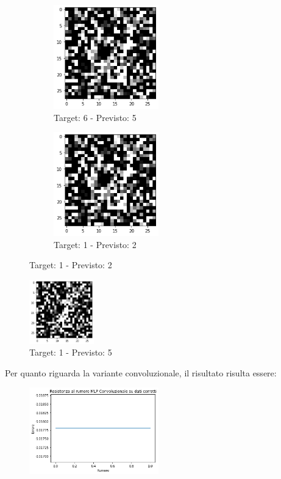 \documentclass[12pt, a4paper]{article}
\begin{document}
\begin{figure}[H]
    \begin{subfigure}{0.5\textwidth}
        \centering
        \caption{Target: 6 - Previsto: 5}
        \includegraphics[width=0.5\textwidth]{ErrClass3.png}
    \end{subfigure}
    \begin{subfigure}{0.5\textwidth}
        \centering
        \caption{Target: 1 - Previsto: 2}
        \includegraphics[width=0.5\textwidth]{ErrClass4.png}
    \end{subfigure}
\end{figure}

\begin{figure}[H]
    \centering
    \caption{Target: 1 - Previsto: 5}
    \includegraphics[width=0.25\textwidth]{ErrClass5.png}
\end{figure}

Per quanto riguarda la variante convoluzionale, il risultato risulta essere:
\begin{figure}[H]
    \centering
    \includegraphics[width=0.50\textwidth]{TPConv.png}
\end{figure}
\end{document}
